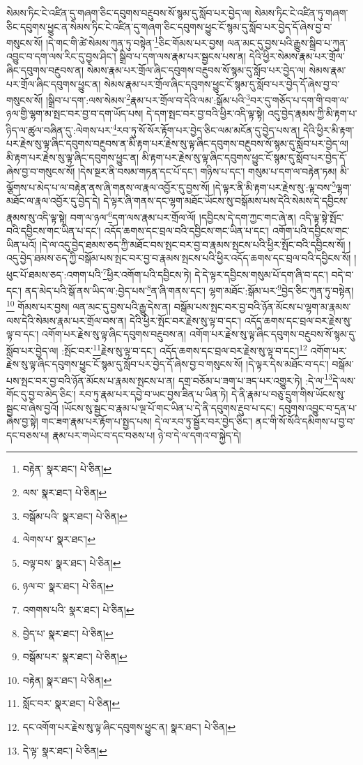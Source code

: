 སེམས་ཏིང་ངེ་འཛིན་དུ་གཞག་ཅིང་དབུགས་བརྔུབས་སོ་སྙམ་དུ་སློབ་པར་བྱེད་ལ། སེམས་ཏིང་ངེ་འཛིན་ཏུ་གཞག་ཅིང་དབུགས་ཕྱུང་ན་སེམས་ཏིང་ངེ་འཛིན་དུ་གཞག་ཅིང་དབུགས་ཕྱུང་ངོ་སྙམ་དུ་སློབ་པར་བྱེད་དོ་ཞེས་བྱ་བ་གསུངས་སོ། །དེ་གང་གི་ཚེ་སེམས་ཀུན་ཏུ་བསྟེན་\footnote{བརྟེན་  སྣར་ཐང་།  པེ་ཅིན། }ཅིང་གོམས་པར་བྱས། ལན་མང་དུ་བྱས་པའི་རྒྱུས་སྒྲིབ་པ་ཀུན་འབྱུང་བ་དག་ལས་རིང་དུ་བྱས་ཤིང་། སྒྲིབ་པ་དག་ལས་རྣམ་པར་སྦྱངས་པས་ན། དེའི་ཕྱིར་སེམས་རྣམ་པར་གྲོལ་ཞིང་དབུགས་བརྔུབས་ན། སེམས་རྣམ་པར་གྲོལ་ཞིང་དབུགས་བརྔུབས་སོ་སྙམ་དུ་སློབ་པར་བྱེད་ལ། སེམས་རྣམ་པར་གྲོལ་ཞིང་དབུགས་ཕྱུང་ན། སེམས་རྣམ་པར་གྲོལ་ཞིང་དབུགས་ཕྱུང་ངོ་སྙམ་དུ་སློབ་པར་བྱེད་དོ་ཞེས་བྱ་བ་གསུངས་སོ། །སྒྲིབ་པ་དག་:ལས་སེམས་\footnote{ལས་  སྣར་ཐང་།  པེ་ཅིན། }རྣམ་པར་གྲོལ་བ་དེའི་ལམ་:སྒོམ་པའི་\footnote{བསྒོམ་པའི་  སྣར་ཐང་།  པེ་ཅིན། }བར་དུ་གཅོད་པ་དག་གི་བག་ལ་ཉལ་གྱི་ལྷག་མ་སྤང་བར་བྱ་བ་དག་ཡོད་པས། དེ་དག་སྤང་བར་བྱ་བའི་ཕྱིར་འདི་ལྟ་སྟེ། འདུ་བྱེད་རྣམས་ཀྱི་མི་རྟག་པ་ཉིད་ལ་ཚུལ་བཞིན་དུ་:ལེགས་པར་\footnote{ལེགས་པ་  སྣར་ཐང་། }རབ་ཏུ་སོ་སོར་རྟོག་པར་བྱེད་ཅིང་ལམ་མངོན་དུ་བྱེད་པས་ན། དེའི་ཕྱིར་མི་རྟག་པར་རྗེས་སུ་ལྟ་ཞིང་དབུགས་བརྔུབས་ན་མི་རྟག་པར་རྗེས་སུ་ལྟ་ཞིང་དབུགས་བརྔུབས་སོ་སྙམ་དུ་སློབ་པར་བྱེད་ལ། མི་རྟག་པར་རྗེས་སུ་ལྟ་ཞིང་དབུགས་ཕྱུང་ན། མི་རྟག་པར་རྗེས་སུ་ལྟ་ཞིང་དབུགས་ཕྱུང་ངོ་སྙམ་དུ་སློབ་པར་བྱེད་དོ་ཞེས་བྱ་བ་གསུངས་སོ། །དེས་སྔར་ནི་བསམ་གཏན་དང་པོ་དང་། གཉིས་པ་དང་། གསུམ་པ་དག་ལ་བརྟེན་ཏམ། མི་ལྕོགས་པ་མེད་པ་ལ་བརྟེན་ནས་ཞི་གནས་ལ་རྣལ་འབྱོར་དུ་བྱས་སོ། །དེ་ལྟར་ནི་མི་རྟག་པར་རྗེས་སུ་:ལྟ་བས་\footnote{བལྟ་བས་  སྣར་ཐང་།  པེ་ཅིན། }ལྷག་མཐོང་ལ་རྣལ་འབྱོར་དུ་བྱེད་དེ། དེ་ལྟར་ཞི་གནས་དང་ལྷག་མཐོང་ཡོངས་སུ་བསྒོམས་པས་དེའི་སེམས་དེ་དབྱིངས་རྣམས་སུ་འདི་ལྟ་སྟེ། བག་ལ་ཉལ་\footnote{ཉལ་བ་  སྣར་ཐང་།  པེ་ཅིན། }དག་ལས་རྣམ་པར་གྲོལ་ལོ། །དབྱིངས་དེ་དག་ཀྱང་གང་ཞེ་ན། འདི་ལྟ་སྟེ་སྤོང་བའི་དབྱིངས་གང་ཡིན་པ་དང་། འདོད་ཆགས་དང་བྲལ་བའི་དབྱིངས་གང་ཡིན་པ་དང་། འགོག་པའི་དབྱིངས་གང་ཡིན་པའོ། །དེ་ལ་འདུ་བྱེད་ཐམས་ཅད་ཀྱི་མཐོང་བས་སྤང་བར་བྱ་བ་རྣམས་སྤངས་པའི་ཕྱིར་སྤོང་བའི་དབྱིངས་སོ། །འདུ་བྱེད་ཐམས་ཅད་ཀྱི་བསྒོམ་པས་སྤང་བར་བྱ་བ་རྣམས་སྤངས་པའི་ཕྱིར་འདོད་ཆགས་དང་བྲལ་བའི་དབྱིངས་སོ། །ཕུང་པོ་ཐམས་ཅད་:འགག་པའི་\footnote{འགགས་པའི་  སྣར་ཐང་།  པེ་ཅིན། }ཕྱིར་འགོག་པའི་དབྱིངས་ཏེ། དེ་དེ་ལྟར་དབྱིངས་གསུམ་པོ་དག་ཞི་བ་དང་། བདེ་བ་དང་། ནད་མེད་པའི་སྒོ་ནས་ཡིད་ལ་:བྱེད་པས་\footnote{བྱེད་པ་  སྣར་ཐང་།  པེ་ཅིན། }ན་ཞི་གནས་དང་། ལྷག་མཐོང་:སྒོམ་པར་\footnote{བསྒོམ་པར་  སྣར་ཐང་།  པེ་ཅིན། }བྱེད་ཅིང་ཀུན་ཏུ་བསྟེན།\footnote{བརྟེན།  སྣར་ཐང་།  པེ་ཅིན། } གོམས་པར་བྱས། ལན་མང་དུ་བྱས་པའི་རྒྱུ་དེས་ན། བསྒོམ་པས་སྤང་བར་བྱ་བའི་ཉོན་མོངས་པ་ལྷག་མ་རྣམས་ལས་དེའི་སེམས་རྣམ་པར་གྲོལ་བས་ན། དེའི་ཕྱིར་སྤོང་བར་རྗེས་སུ་ལྟ་བ་དང་། འདོད་ཆགས་དང་བྲལ་བར་རྗེས་སུ་ལྟ་བ་དང་། འགོག་པར་རྗེས་སུ་ལྟ་ཞིང་དབུགས་བརྔུབས་ན། འགོག་པར་རྗེས་སུ་ལྟ་ཞིང་དབུགས་བརྔུབས་སོ་སྙམ་དུ་སློབ་པར་བྱེད་ལ། :སྤོང་བར་\footnote{སློང་བར་  སྣར་ཐང་།  པེ་ཅིན། }རྗེས་སུ་ལྟ་བ་དང་། འདོད་ཆགས་དང་བྲལ་བར་རྗེས་སུ་ལྟ་བ་དང་།\footnote{དང་འགོག་པར་རྗེས་སུ་ལྟ་ཞིང་དབུགས་ཕྱུང་ན།  སྣར་ཐང་།  པེ་ཅིན། } འགོག་པར་རྗེས་སུ་ལྟ་ཞིང་དབུགས་ཕྱུང་ངོ་སྙམ་དུ་སློབ་པར་བྱེད་དོ་ཞེས་བྱ་བ་གསུངས་སོ། །དེ་ལྟར་དེས་མཐོང་བ་དང་། བསྒོམ་པས་སྤང་བར་བྱ་བའི་ཉོན་མོངས་པ་རྣམས་སྤངས་པ་ན། དགྲ་བཅོམ་པ་ཟག་པ་ཟད་པར་འགྱུར་ཏེ། :དེ་ལ་\footnote{དེ་ལྟ་  སྣར་ཐང་།  པེ་ཅིན། }དེ་ལས་གོང་དུ་བྱ་བ་མེད་ཅིང་། རབ་ཏུ་རྣམ་པར་དབྱེ་བ་ཡང་བྱས་ཟིན་པ་ཡིན་ཏེ། དེ་ནི་རྣམ་པ་བཅུ་དྲུག་གིས་ཡོངས་སུ་སྦྱང་བ་ཞེས་བྱའོ། །ཡོངས་སུ་སྦྱང་བ་རྣམ་པ་ལྔ་པོ་གང་ཡིན་པ་དེ་ནི་དབུགས་རྔུབ་པ་དང་། དབུགས་འབྱུང་བ་དྲན་པ་ཞེས་བྱ་སྟེ། གང་ཟག་རྣམ་པར་རྟོག་པ་སྤྱད་པས། དེ་ལ་རབ་ཏུ་སྦྱོར་བར་བྱེད་ཅིང་། ནང་གི་སོ་སོའི་དམིགས་པ་བྱ་བ་དང་བཅས་པ། རྣམ་པར་གཡེང་བ་དང་བཅས་པ། ཉེ་བ་དེ་ལ་དགའ་བ་སྐྱེད་དེ། 